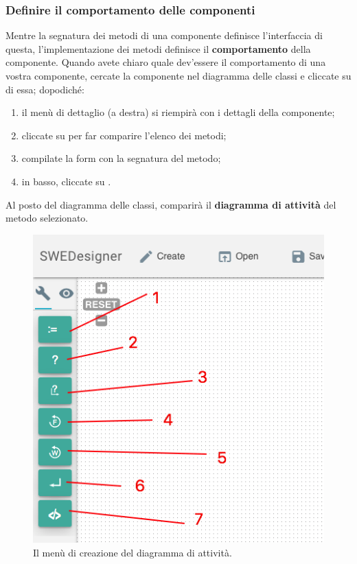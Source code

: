 \subsubsection{Definire il comportamento delle componenti} \label{sec:activity}
Mentre la segnatura dei metodi di una componente definisce l'interfaccia di questa, l'implementazione dei metodi definisce il \textbf{comportamento} della componente. Quando avete chiaro quale dev'essere il comportamento di una vostra componente, cercate la componente nel diagramma delle classi e cliccate su di essa; dopodiché:
\begin{enumerate}
	\item il menù di dettaglio (a destra) si riempirà con i dettagli della componente;
	\item cliccate su  per far comparire l'elenco dei metodi;
	\item compilate la form con la segnatura del metodo;
	\item in basso, cliccate su .
\end{enumerate}
Al posto del diagramma delle classi, comparirà il \textbf{diagramma di attività} del metodo selezionato.

\begin{figure}[h]
\centering
	\includegraphics[scale=0.4]{img/creation_activity}
	\caption{Il menù di creazione del diagramma di attività.}
	\label{fig:creation_activity}
\end{figure}

